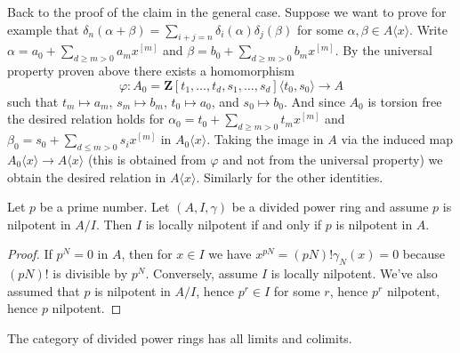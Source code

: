 \begin{example}
\medskip\noindent
Back to the proof of the claim in the general case. Suppose we want
to prove for example that
$\delta_n(\alpha + \beta) = \sum_{i + j = n} \delta_i(\alpha)\delta_j(\beta)$
for some $\alpha, \beta \in A\langle x \rangle$.
Write $\alpha = a_0 + \sum_{d \geq m > 0} a_m x^{[m]}$ and
$\beta = b_0 + \sum_{d \geq m > 0} b_m x^{[m]}$.
By the universal property proven above there exists a homomorphism
$$
\varphi :
A_0 =
\mathbf{Z}[t_1, \ldots, t_d, s_1, \ldots, s_d]\langle t_0, s_0 \rangle
\longrightarrow
A
$$
such that $t_m \mapsto a_m$, $s_m \mapsto b_m$, $t_0 \mapsto a_0$, and
$s_0 \mapsto b_0$. And since $A_0$ is torsion free the desired relation
holds for $\alpha_0 = t_0 + \sum_{d \geq m > 0} t_m x^{[m]}$ and
$\beta_0 = s_0 + \sum_{d \leq m > 0} s_i x^{[m]}$ in
$A_0\langle x \rangle$. Taking the image in $A$ via the induced
map $A_0\langle x \rangle \to A\langle x \rangle$ (this is obtained
from $\varphi$ and not from the universal property)
we obtain the desired relation in $A\langle x \rangle$.
Similarly for the other identities.
\end{example}


\begin{lemma}
\label{lemma-nil}
Let $p$ be a prime number. Let $(A, I, \gamma)$ be a divided power ring
and assume $p$ is nilpotent in $A/I$.
Then $I$ is locally nilpotent if and only if $p$ is nilpotent in $A$.
\end{lemma}

\begin{proof}
If $p^N = 0$ in $A$, then for $x \in I$ we have
$x^{pN} = (pN)!\gamma_N(x) = 0$ because $(pN)!$ is
divisible by $p^N$. Conversely, assume $I$ is locally nilpotent.
We've also assumed that $p$ is nilpotent in $A/I$, hence
$p^r \in I$ for some $r$, hence $p^r$ nilpotent, hence $p$ nilpotent.
\end{proof}

\begin{lemma}
\label{lemma-colimits}
The category of divided power rings has all limits and colimits.
\end{lemma}

